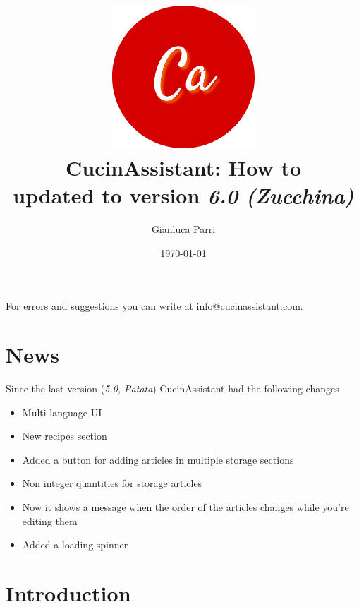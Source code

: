 \documentclass[12pt, a4paper]{report}
\begin{document}
    \title{
        \includegraphics[width=0.4\textwidth]{assets/logo.png}\\
        [1cm]CucinAssistant: How to\\
        \large updated to version \emph{6.0 (Zucchina)}
    }
    \author{Gianluca Parri}
    \date{\today}
    \maketitle



    \tableofcontents
    \vfill
    \noindent For errors and suggestions you can write at \mbox{info@cucinassistant.com}.



    \chapter{News}
    
    Since the last version (\emph{5.0, Patata}) CucinAssistant had the following changes

    \begin{itemize}
        \item Multi language UI
        \item New recipes section
        \item Added a button for adding articles in multiple storage sections
        \item Non integer quantities for storage articles
        \item Now it shows a message when the order of the articles changes while you're editing them
        \item Added a loading spinner
    \end{itemize}



    \chapter{Introduction}
\end{document}
